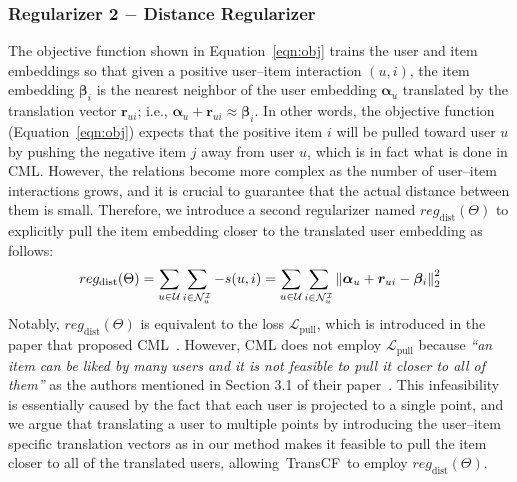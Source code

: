 \documentclass[conference]{IEEEtran}
\newcommand{\norm}[1]{\left\lVert#1\right\rVert}
\newcommand{\propose}{\textsf{{TransCF}}}
\begin{document}
\subsubsection{\textbf{Regularizer 2 $-$ Distance Regularizer}}
\label{subsec:reg_dist}
The objective function shown in Equation~\ref{eqn:obj} trains the user and item embeddings so that given a positive user--item interaction $(u,i)$, the item embedding $\bm{\beta}_i$ is the nearest neighbor of the user embedding $\bm{\alpha}_u$ translated by the translation vector $\bm{r}_{ui}$; i.e., $\bm{\alpha}_u + \bm{r}_{ui} \approx \bm{\beta}_i$. 
In other words, the objective function (Equation~\ref{eqn:obj}) expects that the positive item $i$ will be pulled toward user $u$ by pushing the negative item $j$ away from user $u$, which is in fact what is done in CML.
However, the relations become more complex as the number of user--item interactions grows, and it is crucial to guarantee that the actual distance between them is small. Therefore, we introduce a second regularizer named $re{g_{\mathrm{dist}}}(\Theta)$ to explicitly pull the item embedding closer to the translated user embedding as follows:
\begin{equation}
	\small
	\label{eqn:reg_dist}
	re{g_{\mathrm{dist}}}(\Theta ) = \sum\limits_{u \in \mathcal{U}} {\sum\limits_{i \in {\mathcal{N}^\mathcal{I}_u}} {-s(u,i)} }  = \sum\limits_{u \in \mathcal{U}} {\sum\limits_{i \in {\mathcal{N}^\mathcal{I}_u}} {\norm{\bm{\alpha}_u + \bm{r}_{ui} - \bm{\beta}_i}_2^2} } 
\end{equation}
Notably, $re{g_{\mathrm{dist}}}(\Theta)$ is equivalent to the loss $\mathcal{L}_{\mathrm{pull}}$, which is introduced in the paper that proposed CML~\cite{hsieh2017collaborative}. 
However, CML does not employ $\mathcal{L}_{\mathrm{pull}}$ because \textit{``an item can be liked by many users and it is not feasible to pull it closer to all of them''} as the authors mentioned in Section 3.1 of their paper~\cite{hsieh2017collaborative}. This infeasibility is essentially caused by the fact that each user is projected to a single point,
and we argue that translating a user to multiple points by introducing the user--item specific translation vectors as in our method makes it feasible to pull the item closer to all of the translated users, allowing~\propose~to employ $re{g_{\mathrm{dist}}}(\Theta)$.
\end{document}
